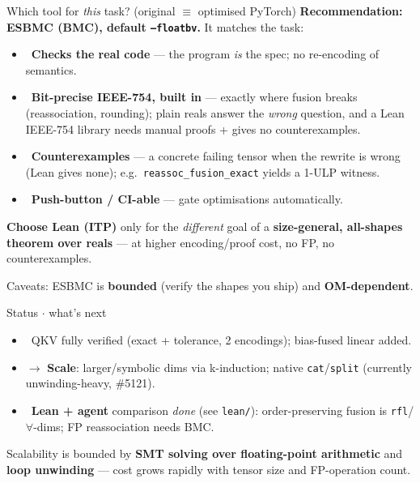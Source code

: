 \documentclass[aspectratio=169,11pt]{beamer}
\newcommand{\good}{\textcolor{ok}{\ding{51}}}
\begin{document}
\begin{frame}{Which tool for \emph{this} task? (original $\equiv$ optimised PyTorch)}
  \textbf{Recommendation: ESBMC (BMC), default \texttt{--floatbv}.} It matches the task:
  \begin{itemize}
    \item \good\ \textbf{Checks the real code} --- the program \emph{is} the spec; no re-encoding of semantics.
    \item \good\ \textbf{Bit-precise IEEE-754, built in} --- exactly where fusion breaks (reassociation, rounding); plain reals answer the \emph{wrong} question, and a Lean IEEE-754 library needs manual proofs {+} gives no counterexamples.
    \item \good\ \textbf{Counterexamples} --- a concrete failing tensor when the rewrite is wrong (Lean gives none); e.g.\ \texttt{reassoc\_fusion\_exact} yields a 1-ULP witness.
    \item \good\ \textbf{Push-button / CI-able} --- gate optimisations automatically.
  \end{itemize}
  \textbf{Choose Lean (ITP)} only for the \emph{different} goal of a \textbf{size-general,
  all-shapes theorem over reals} --- at higher encoding/proof cost, no FP, no counterexamples.
  \begin{block}{}
    \centering Caveats: ESBMC is \textbf{bounded} (verify the shapes you ship) and \textbf{OM-dependent}.
  \end{block}
\end{frame}

\begin{frame}{Status $\cdot$ what's next}
  \begin{itemize}
    \item \good\ QKV fully verified (exact {+} tolerance, 2 encodings); bias-fused linear added.
    \item $\rightarrow$ \textbf{Scale}: larger/symbolic dims via k-induction; native \texttt{cat}/\texttt{split}
      (currently unwinding-heavy, \#5121).
    \item \good\ \textbf{Lean {+} agent} comparison \emph{done} (see \texttt{lean/}): order-preserving
      fusion is \texttt{rfl}/$\forall$-dims; FP reassociation needs BMC.
  \end{itemize}
  \medskip
  {\footnotesize Scalability is bounded by \textbf{SMT solving over floating-point arithmetic} and
  \textbf{loop unwinding} --- cost grows rapidly with tensor size and FP-operation count.}
\end{frame}
\end{document}
